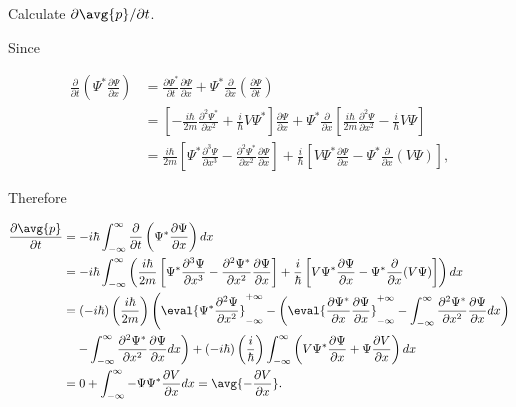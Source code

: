 \documentclass[a4paper,12pt]{report}
\begin{document}
{Calculate \(\partial \avg{p} /\partial t  \).}
{Since 
		
\begin{equation}
	\begin{aligned}
		\frac{\partial}{\partial t}\left(\Psi^* \frac{\partial \Psi}{\partial x}\right) & =\frac{\partial \Psi^*}{\partial t} \frac{\partial \Psi}{\partial x}+\Psi^* \frac{\partial}{\partial x}\left(\frac{\partial \Psi}{\partial t}\right) \\
		& =\left[-\frac{i \hbar}{2 m} \frac{\partial^2 \Psi^*}{\partial x^2}+\frac{i}{\hbar} V \Psi^*\right] \frac{\partial \Psi}{\partial x}+\Psi^* \frac{\partial}{\partial x}\left[\frac{i \hbar}{2 m} \frac{\partial^2 \Psi}{\partial x^2}-\frac{i}{\hbar} V \Psi\right] \\
		& =\frac{i \hbar}{2 m}\left[\Psi^* \frac{\partial^3 \Psi}{\partial x^3}-\frac{\partial^2 \Psi^*}{\partial x^2} \frac{\partial \Psi}{\partial x}\right]+\frac{i}{\hbar}\left[V \Psi^* \frac{\partial \Psi}{\partial x}-\Psi^* \frac{\partial}{\partial x}(V \Psi)\right],
	\end{aligned}
\end{equation}
		
Therefore

\begin{equation}
  \begin{aligned}
      \frac{\partial \avg{p}}{\partial t} &= -i\hbar \int_{-\infty}^{\infty} \frac{\partial}{\partial t} \left(\Psi^* \frac{\partial \Psi}{\partial x} \right) dx \\ 
      &= -i\hbar \int_{-\infty}^{\infty} \left( \frac{i\hbar}{2m} \left[ \Psi^* \frac{\partial^3 \Psi}{\partial x^3} - \frac{\partial^2 \Psi^*}{\partial x^2} \frac{\partial \Psi}{\partial x} \right] 
      + \frac{i}{\hbar} \left[ V \Psi^* \frac{\partial \Psi}{\partial x} - \Psi^* \frac{\partial}{\partial x}(V \Psi) \right] \right) dx \\ 
      &= (-i\hbar) \left( \frac{i\hbar}{2m} \right) 
      \left( \eval{\Psi^* \frac{\partial^2 \Psi}{\partial x^2}}_{-\infty}^{+\infty} 
      - \left( \eval{\frac{\partial \Psi^*}{\partial x} \frac{\partial \Psi}{\partial x}}_{-\infty}^{+\infty} 
      - \int_{-\infty}^{\infty} \frac{\partial^2 \Psi^*}{\partial x^2} \frac{\partial \Psi}{\partial x} dx \right) \right. \\ 
      & \quad \left. - \int_{-\infty}^{\infty} \frac{\partial^2 \Psi^*}{\partial x^2} \frac{\partial \Psi}{\partial x} dx \right) 
      + (-i\hbar) \left( \frac{i}{\hbar} \right) 
      \int_{-\infty}^{\infty} \left( V \Psi^* \frac{\partial \Psi}{\partial x} + \Psi \frac{\partial V}{\partial x} \right) dx \\ 
      &= 0 + \int_{-\infty}^{\infty} -\Psi \Psi^* \frac{\partial V}{\partial x} dx = \avg{-\frac{\partial V}{\partial x}}.
  \end{aligned}
  \end{equation}
	
}
\end{document}
